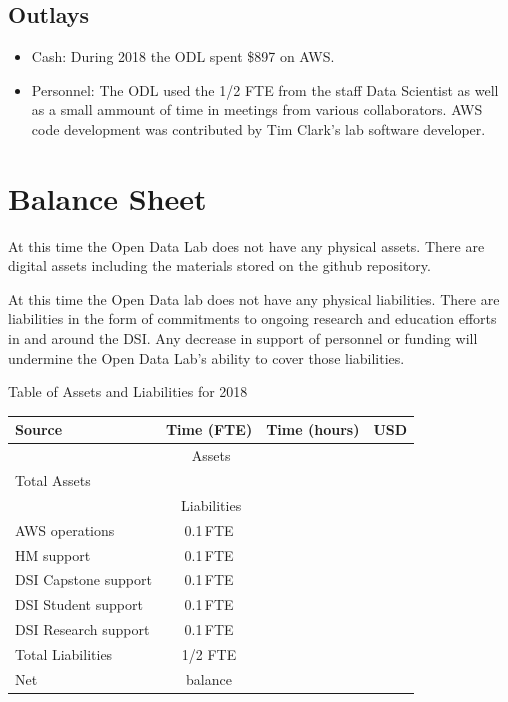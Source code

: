\subsection{Outlays}
\begin{itemize}
\item Cash: During 2018 the ODL spent \$897 on AWS.
\item Personnel: The ODL used the 1/2 FTE from the staff Data Scientist as well as a small ammount of time in meetings from various collaborators. AWS code development was contributed by Tim Clark's lab software developer.
\end{itemize}

\section{Balance Sheet} %
At this time the Open Data Lab does not have any physical assets. There are digital assets including the materials stored on the github repository.

At this time the Open Data lab does not have any physical liabilities. There are liabilities in the form of commitments to ongoing research and education efforts in and around the DSI. Any decrease in support of personnel or funding will undermine the Open Data Lab's ability to cover those liabilities.

\begin{center}
Table of Assets and Liabilities for 2018

\begin{tabular}{lccr}
\hline
\hline
Source & Time (FTE) & Time (hours) & USD \\
\hline
\multicolumn{4}{c}{Assets} \\
\hline
\hline
Total Assets &  &  &  \\
\hline
\hline
\multicolumn{4}{c}{Liabilities} \\
\hline
AWS operations & 0.1\,FTE & &  \\
HM support & 0.1\,FTE &  & \\
DSI Capstone support & 0.1\,FTE & & \\
DSI Student support & 0.1\,FTE & & \\
DSI Research support & 0.1\,FTE & & \\
\hline
Total Liabilities & 1/2 FTE &  &  \\
\hline
\hline
Net & balance &  &  \\
\hline
\hline
\end{tabular}
\end{center}

